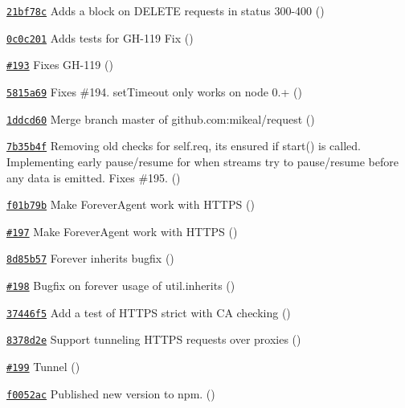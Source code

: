 \begin{DoxyItemize}
\item \href{https://github.com/mikeal/request/commit/21bf78c264316f75f4e6c571461521cda6ccf088}{\tt 21bf78c} Adds a block on D\+E\+L\+E\+T\+E requests in status 300-\/400 ()
\item \href{https://github.com/mikeal/request/commit/0c0c20139b28b21a860f72b8ce0124046fae421d}{\tt 0c0c201} Adds tests for G\+H-\/119 Fix ()
\item \href{https://github.com/mikeal/request/pull/193}{\tt \#193} Fixes G\+H-\/119 ()
\item \href{https://github.com/mikeal/request/commit/5815a697347f20658dc2bdfd0d06e41d0aa0dac4}{\tt 5815a69} Fixes \#194. set\+Timeout only works on node 0.+ ()
\item \href{https://github.com/mikeal/request/commit/1ddcd605bc8936c5b3534e1cf9aa1b29fa2b060b}{\tt 1ddcd60} Merge branch \textquotesingle{}master\textquotesingle{} of github.\+com\+:mikeal/request ()
\item \href{https://github.com/mikeal/request/commit/7b35b4ff63bbdf133f0f600a88a87b5723d29bdf}{\tt 7b35b4f} Removing old checks for self.\+req, it\textquotesingle{}s ensured if start() is called. Implementing early pause/resume for when streams try to pause/resume before any data is emitted. Fixes \#195. ()
\item \href{https://github.com/mikeal/request/commit/f01b79bb651f64065bac8877739223527f5b5592}{\tt f01b79b} Make Forever\+Agent work with H\+T\+T\+P\+S ()
\item \href{https://github.com/mikeal/request/pull/197}{\tt \#197} Make Forever\+Agent work with H\+T\+T\+P\+S ()
\item \href{https://github.com/mikeal/request/commit/8d85b57ebb81c9d2d0a6b94aed41bf2ab0e3ad09}{\tt 8d85b57} Forever inherits bugfix ()
\item \href{https://github.com/mikeal/request/pull/198}{\tt \#198} Bugfix on forever usage of util.\+inherits ()
\item \href{https://github.com/mikeal/request/commit/37446f54bb21cf9c83ffa81d354d799ae7ecf9ed}{\tt 37446f5} Add a test of H\+T\+T\+P\+S strict with C\+A checking ()
\item \href{https://github.com/mikeal/request/commit/8378d2ef9b8121a9851d21b3f6ec8304bde61c9d}{\tt 8378d2e} Support tunneling H\+T\+T\+P\+S requests over proxies ()
\item \href{https://github.com/mikeal/request/pull/199}{\tt \#199} Tunnel ()
\item \href{https://github.com/mikeal/request/commit/f0052ac5e6ca9f3f4aa49f6cda6ba15eb5d8b8e6}{\tt f0052ac} Published new version to npm. ()

\end{DoxyItemize}

